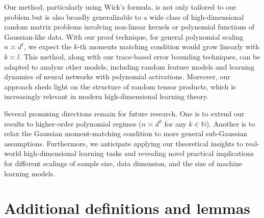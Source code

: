 \documentclass[twoside,11pt]{article}
\newcommand{\N}{\mathbb{N}}
\newcommand{\1}{\mathbf{1}}
\begin{document}
Our method, particularly using Wick’s formula, is not only tailored to our problem but is also broadly generalizable to a wide class of high-dimensional random matrix problems involving non-linear kernels or polynomial functions of Gaussian-like data.
With our proof technique, for general polynomial scaling $n\asymp d^{\ell}$, we expect the $k$-th moments matching condition would grow linearly with $k\asymp l$. This method, along with our trace-based error bounding techniques, can be adapted to analyze other models, including random feature models and learning dynamics of neural networks with polynomial activations. Moreover, our approach sheds light on the structure of random tensor products, which is increasingly relevant in modern high-dimensional learning theory.


Several promising directions remain for future research. One is to extend our results to higher-order polynomial regimes ($n\asymp d^k$ for any $k\in\N$). Another is to relax the Gaussian moment-matching condition to more general sub-Gaussian assumptions. Furthermore, we anticipate applying our theoretical insights to real-world high-dimensional learning tasks and revealing novel practical implications for different scalings of sample size, data dimension, and the size of machine learning models.




\newpage
\appendix



\section{Additional definitions and lemmas}\label{sec:appendix}
\end{document}
